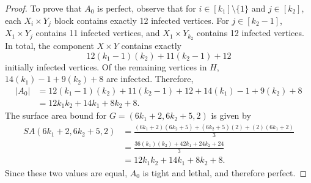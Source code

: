 \begin{proof}
To prove that $A_0$ is perfect, observe that for $i \in [k_1] \setminus \{1\}$ and $j \in [k_2]$, each $X_i \times Y_j$ block contains exactly 12 infected vertices. For $j \in [k_2 -1]$, $X_1 \times Y_j$ contains 11 infected vertices, and $X_1 \times Y_{k_2}$ contains 12 infected vertices. In total, the component $X \times Y$ contains exactly 
$$12(k_1-1)(k_2) + 11(k_2-1) + 12$$
initially infected vertices. Of the remaining vertices in $H$, $14(k_1) - 1 +9(k_2) + 8$ are infected. Therefore, 
\begin{align*}
|A_0| &= 12(k_1-1)(k_2) + 11(k_2-1) + 12+14(k_1) - 1 +9(k_2) + 8 \\
&= 12k_1k_2 + 14k_1 + 8k_2 +8.
\end{align*}
The surface area bound for $G=(6k_1+2,6k_2+5,2)$ is given by
\begin{align*}
SA(6k_1+2,6k_2+5,2) &= \frac{(6k_1+2)(6k_2 + 5) + (6k_2+5)(2) + (2)(6k_1+2)}{3} \\
&= \frac{36(k_1)(k_2) +42k_1 +24k_2 + 24}{3} \\
&= 12k_1k_2 +14k_1+8k_2+8.
\end{align*}
Since these two values are equal, $A_0$ is tight and lethal, and therefore perfect.
\end{proof}

